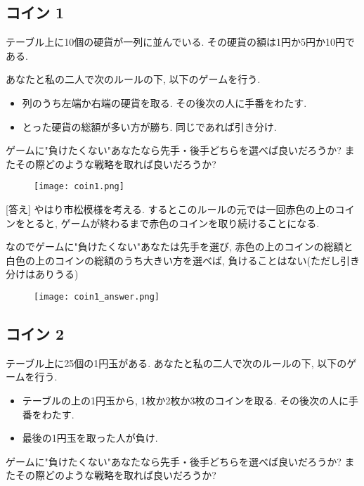 \documentclass[dvipdfmx,a4paper,12pt]{article} %
\theoremstyle{definition}
\theoremstyle{remark}
\numberwithin{equation}{section}
\begin{document}
\subsection{コイン 1}
\begin{tcolorbox}[mybox]
テーブル上に10個の硬貨が一列に並んでいる. 
その硬貨の額は1円か5円か10円である. 

あなたと私の二人で次のルールの下, 以下のゲームを行う.
\begin{itemize}
\item 列のうち左端か右端の硬貨を取る. その後次の人に手番をわたす.
\item とった硬貨の総額が多い方が勝ち. 同じであれば引き分け. 
\end{itemize}

ゲームに"負けたくない"あなたなら先手・後手どちらを選べば良いだろうか?
またその際どのような戦略を取れば良いだろうか?
\end{tcolorbox}
\begin{figure}[htbp]
\begin{center}
\texttt{[image: coin1.png]}
\end{center}
\end{figure}

[答え]
やはり市松模様を考える. するとこのルールの元では一回赤色の上のコインをとると, ゲームが終わるまで赤色のコインを取り続けることになる. 

なのでゲームに"負けたくない"あなたは先手を選び, 赤色の上のコインの総額と白色の上のコインの総額のうち大きい方を選べば, 負けることはない(ただし引き分けはありうる)
\begin{figure}[htbp]
\begin{center}
\texttt{[image: coin1\_answer.png]}
\end{center}
\end{figure}


\subsection{コイン 2}

\begin{tcolorbox}[mybox]
テーブル上に25個の1円玉がある.
あなたと私の二人で次のルールの下, 以下のゲームを行う.

\begin{itemize}
\item テーブルの上の1円玉から, 1枚か2枚か3枚のコインを取る. その後次の人に手番をわたす.
\item 最後の1円玉を取った人が負け.
\end{itemize}

ゲームに"負けたくない"あなたなら先手・後手どちらを選べば良いだろうか?
またその際どのような戦略を取れば良いだろうか?
\end{tcolorbox}
\end{document}
